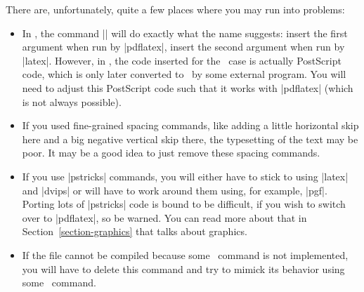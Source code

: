 There are, unfortunately, quite a few places where you may run into problems:
\begin{itemize}
\item
  In \beamer, the command |\PDForPS| will do exactly what the name suggests: insert the first argument when run by |pdflatex|, insert the second argument when run by |latex|. However, in \prosper, the code inserted for the \pdf\ case is actually PostScript code, which is only later converted to \pdf\ by some external program. You will need to adjust this PostScript code such that it works with |pdflatex| (which is not always possible).
\item
  If you used fine-grained spacing commands, like adding a little horizontal skip   here and a big negative vertical skip there, the typesetting of the text may be poor. It may be a good idea to just remove these spacing commands.
\item
  If you use |pstricks| commands, you will either have to stick to using |latex| and |dvips| or will have to work around them using, for example, |pgf|. Porting lots of |pstricks| code is bound to be difficult, if you wish to switch over to |pdflatex|, so be warned. You can read more about that in Section~\ref{section-graphics} that talks about graphics.
\item
  If the file cannot be compiled because some \prosper\ command is not implemented, you will have to delete this command and try to mimick its behavior using some \beamer\ command.
\end{itemize}

